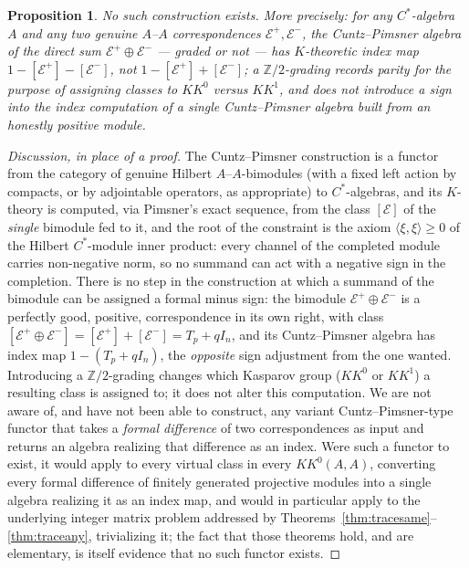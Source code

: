 \documentclass[11pt]{amsart}
\numberwithin{equation}{section}
\newtheorem{proposition}[theorem]{Proposition}
\theoremstyle{definition}
\theoremstyle{remark}
\newcommand{\Z}{\mathbb{Z}}
\newcommand{\cE}{\mathcal{E}}
\begin{document}
\begin{proposition}\label{prop:nograding}
No such construction exists. More precisely: for any $C^*$-algebra $A$ and any two
genuine $A$--$A$ correspondences $\cE^+,\cE^-$, the Cuntz--Pimsner algebra of the direct
sum $\cE^+\oplus\cE^-$ --- graded or not --- has $K$-theoretic index map
$1-[\cE^+]-[\cE^-]$, not $1-[\cE^+]+[\cE^-]$; a $\Z/2$-grading records parity for the
purpose of assigning classes to $KK^0$ versus $KK^1$, and does not introduce a sign into
the index computation of a single Cuntz--Pimsner algebra built from an honestly positive
module.
\end{proposition}

\begin{proof}[Discussion, in place of a proof]
The Cuntz--Pimsner construction is a functor from the category of genuine Hilbert
$A$--$A$-bimodules (with a fixed left action by compacts, or by adjointable operators, as
appropriate) to $C^*$-algebras, and its $K$-theory is computed, via Pimsner's exact
sequence, from the class $[\cE]$ of the \emph{single} bimodule fed to it, and the root
of the constraint is the axiom $\langle\xi,\xi\rangle\ge0$ of the Hilbert $C^*$-module
inner product: every channel of the completed module carries non-negative norm, so no
summand can act with a negative sign in the completion. There is no step in the
construction at which a summand of the bimodule can be assigned a formal minus sign: the bimodule $\cE^+\oplus\cE^-$ is a perfectly good, positive, correspondence
in its own right, with class $[\cE^+\oplus\cE^-]=[\cE^+]+[\cE^-]=T_p+qI_n$, and its
Cuntz--Pimsner algebra has index map $1-(T_p+qI_n)$, the \emph{opposite} sign
adjustment from the one wanted. Introducing a $\Z/2$-grading changes which Kasparov
group ($KK^0$ or $KK^1$) a resulting class is assigned to; it does not alter this
computation. We are not aware of, and have not been able to construct, any variant
Cuntz--Pimsner-type functor that takes a \emph{formal difference} of two correspondences
as input and returns an algebra realizing that difference as an index. Were such a
functor to exist, it would apply to every virtual class in every $KK^0(A,A)$, converting
every formal difference of finitely generated projective modules into a single algebra
realizing it as an index map, and would in particular apply to the underlying integer
matrix problem addressed by Theorems~\ref{thm:tracesame}--\ref{thm:traceany}, trivializing
it; the fact that those theorems hold, and are elementary, is itself evidence that no
such functor exists.
\end{proof}
\end{document}
